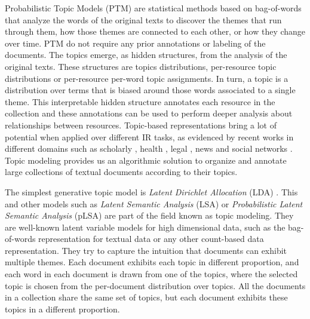Probabilistic Topic Models (PTM)\cite{Blei2010} are statistical methods based on bag-of-words that analyze the words of the original texts to discover the themes that run through them, how those themes are connected to each other, or how they change over time. PTM do not require any prior annotations or labeling of the documents. The topics emerge, as hidden structures, from the analysis of the original texts. These structures are topics distributions, per-resource topic distributions or per-resource per-word topic assignments. In turn, a topic is a distribution over terms that is biased around those words associated to a single theme. This interpretable hidden structure annotates each resource in the collection and these annotations can be used to perform deeper analysis about relationships between resources. Topic-based representations bring a lot of potential when applied over different IR tasks, as evidenced by recent works in different domains such as scholarly  \citep{Gatti2015}, health \citep{Lu2016,TapiNzali2017}, legal \citep{ONeill2017,Greene2016}, news \citep{He2017} and social networks \citep{Cheng2014a}. Topic modeling provides us an algorithmic solution to organize and annotate large collections of textual documents according to their topics.

The simplest generative topic model is \textit{Latent Dirichlet Allocation} (LDA) \cite{Blei2003}. This and other models such as \textit{Latent Semantic Analysis} (LSA) \cite{Deerwester1990} or \textit{Probabilistic Latent Semantic Analysis} (pLSA) \cite{Hofmann2001} are part of the field known as topic modeling. They are well-known latent variable models for high dimensional data, such as the bag-of-words representation for textual data or any other count-based data representation. They try to capture the intuition that documents can exhibit multiple themes. Each document exhibits each topic in different proportion, and each word in each document is drawn from one of the topics, where the selected topic is chosen from the per-document distribution over topics. All the documents in a collection share the same set of topics, but each document exhibits these topics in a different proportion. 

